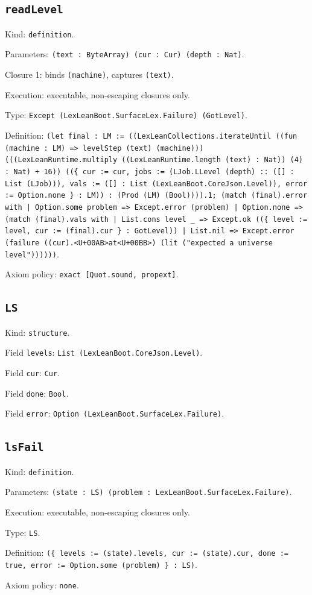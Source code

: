 \documentclass[11pt]{article}
\begin{document}
\subsection*{\texttt{readLevel}}
\noindent Kind: \texttt{definition}.\par
\noindent Parameters: \texttt{(text : ByteArray) (cur : Cur) (depth : Nat)}.\par
\noindent Closure 1: binds \texttt{(machine)}, captures \texttt{(text)}.\par
\noindent Execution: executable, non-escaping closures only.\par
\noindent Type: \texttt{Except (LexLeanBoot.SurfaceLex.Failure) (GotLevel)}.\par
\noindent Definition: \texttt{(let final : LM := ((LexLeanCollections.iterateUntil ((fun (machine : LM) => levelStep (text) (machine))) (((LexLeanRuntime.multiply ((LexLeanRuntime.length (text) : Nat)) (4) : Nat) + 16)) ((\{ cur := cur, jobs := (LJob.LLevel (depth) :: ([] : List (LJob))), vals := ([] : List (LexLeanBoot.CoreJson.Level)), error := Option.none \} : LM)) : (Prod (LM) (Bool)))).1; (match (final).error with | Option.some problem => Except.error (problem) | Option.none => (match (final).vals with | List.cons level \_ => Except.ok ((\{ level := level, cur := (final).cur \} : GotLevel)) | List.nil => Except.error (failure ((cur).<U+00AB>at<U+00BB>) (lit ("expected a universe level"))))))}.\par
\noindent Axiom policy: \texttt{exact [Quot.sound, propext]}.\par
\subsection*{\texttt{LS}}
\noindent Kind: \texttt{structure}.\par
\noindent Field \texttt{levels}: \texttt{List (LexLeanBoot.CoreJson.Level)}.\par
\noindent Field \texttt{cur}: \texttt{Cur}.\par
\noindent Field \texttt{done}: \texttt{Bool}.\par
\noindent Field \texttt{error}: \texttt{Option (LexLeanBoot.SurfaceLex.Failure)}.\par
\subsection*{\texttt{lsFail}}
\noindent Kind: \texttt{definition}.\par
\noindent Parameters: \texttt{(state : LS) (problem : LexLeanBoot.SurfaceLex.Failure)}.\par
\noindent Execution: executable, non-escaping closures only.\par
\noindent Type: \texttt{LS}.\par
\noindent Definition: \texttt{(\{ levels := (state).levels, cur := (state).cur, done := true, error := Option.some (problem) \} : LS)}.\par
\noindent Axiom policy: \texttt{none}.\par
\end{document}
